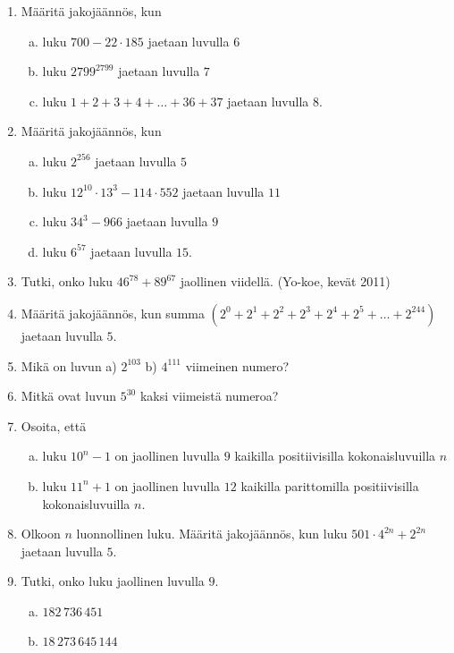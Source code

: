 \begin{enumerate}

\item Määritä jakojäännös, kun
\begin{enumerate}[a)]
\item luku $700 - 22 \cdot 185$ jaetaan luvulla $6$
\item luku $2799^{2799}$ jaetaan luvulla $7$
\item luku $1+2+3+4+ \ldots + 36 + 37$ jaetaan luvulla $8$.
\end{enumerate}

\item Määritä jakojäännös, kun
\begin{enumerate}[a)]
\item luku $2^{256}$ jaetaan luvulla $5$
\item luku $12^{10} \cdot 13^{3} - 114 \cdot 552$ jaetaan luvulla $11$
\item luku $34^{3} - 966$ jaetaan luvulla $9$
\item luku $6^{57}$ jaetaan luvulla $15$.
\end{enumerate}


\item
Tutki, onko luku $46^{78} + 89^{67}$ jaollinen viidellä. (Yo-koe, kevät 2011)

\item Määritä jakojäännös, kun summa $(2^0 + 2^1 + 2^2 + 2^3 + 2^4 + 2^5 + \ldots + 2^{244})$ jaetaan luvulla $5$.

\item Mikä on luvun a) $2^{103}$  b) $4^{111}$ viimeinen numero?

\item Mitkä ovat luvun $5^{30}$ kaksi viimeistä numeroa?

\item Osoita, että
\begin{enumerate}[a)]
\item luku $10^n - 1$ on jaollinen luvulla $9$ kaikilla positiivisilla kokonaisluvuilla $n$
\item luku $11^n + 1$ on jaollinen luvulla $12$ kaikilla parittomilla positiivisilla kokonaisluvuilla $n$.
\end{enumerate}

\item Olkoon $n$ luonnollinen luku. Määritä jakojäännös, kun luku $501 \cdot 4^{2n} + 2^{2n}$ jaetaan luvulla $5$.

\item
Tutki, onko luku jaollinen luvulla $9$.
\begin{enumerate}[a)]
\item $182\, 736\, 451$
\item $18\, 273\, 645\, 144$
\end{enumerate}


\end{enumerate}
